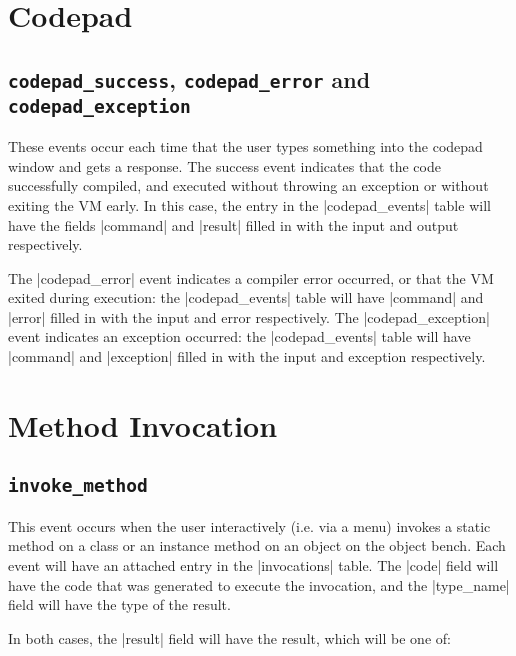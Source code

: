 \documentclass{book}
\begin{document}
\section{Codepad}


\subsection{\lstinline|codepad_success|, \lstinline|codepad_error| and
  \lstinline|codepad_exception|}

These events occur each time that the user types something into the codepad
window and gets a response.  The success event indicates that the code
successfully compiled, and executed without throwing an exception or without
exiting the VM early.  In this case, the entry in the |codepad_events| table
will have the fields |command| and |result| filled in with the input and
output respectively.

The |codepad_error| event indicates a compiler error occurred, or that the VM
exited during execution: the
|codepad_events| table will have |command| and |error| filled in with the
input and error respectively.  The |codepad_exception| event indicates an exception occurred: the
|codepad_events| table will have |command| and |exception| filled in with the
input and exception respectively.

\section{Method Invocation}


\subsection{\lstinline|invoke_method|}

This event occurs when the user interactively (i.e. via a menu) invokes a
static method on a class or an instance method on an object on the object
bench.  Each event will have an attached entry in the |invocations| table.
The |code| field will have the
code that was generated to execute the invocation, and the |type_name| field
will have the type of the result.

In both cases, the |result| field will have the result, which will be one of:
\end{document}
